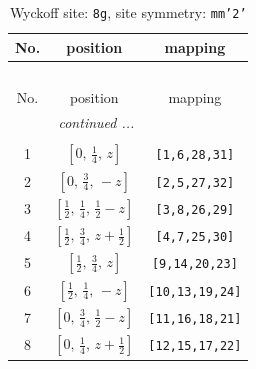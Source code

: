 \documentclass[fleqn,8pt]{jsarticle}
\begin{document}
\begin{longtable}{ccc}
\caption{Wyckoff site: {\tt 8g}, site symmetry: {\tt mm'2'}}
 \\
 \hline \hline
No. & position & mapping \\ \hline \endfirsthead

\multicolumn{2}{l}{\tablename\ \thetable{}} \\
 \hline \hline
No. & position & mapping \\ \hline \endhead

 \hline \hline
\multicolumn{2}{r}{\footnotesize\it continued ...} \\ \endfoot

 \hline \hline
\multicolumn{2}{r}{} \\ \endlastfoot

1 & $\left[ 0,\, \frac{1}{4},\, z \right]$ & {\tt [1,6,28,31]} \\ \hline
2 & $\left[ 0,\, \frac{3}{4},\, - z \right]$ & {\tt [2,5,27,32]} \\ \hline
3 & $\left[ \frac{1}{2},\, \frac{1}{4},\, \frac{1}{2} - z \right]$ & {\tt [3,8,26,29]} \\ \hline
4 & $\left[ \frac{1}{2},\, \frac{3}{4},\, z + \frac{1}{2} \right]$ & {\tt [4,7,25,30]} \\ \hline
5 & $\left[ \frac{1}{2},\, \frac{3}{4},\, z \right]$ & {\tt [9,14,20,23]} \\ \hline
6 & $\left[ \frac{1}{2},\, \frac{1}{4},\, - z \right]$ & {\tt [10,13,19,24]} \\ \hline
7 & $\left[ 0,\, \frac{3}{4},\, \frac{1}{2} - z \right]$ & {\tt [11,16,18,21]} \\ \hline
8 & $\left[ 0,\, \frac{1}{4},\, z + \frac{1}{2} \right]$ & {\tt [12,15,17,22]} \\
\end{longtable}
\renewcommand{\arraystretch}{1.2}
\end{document}
